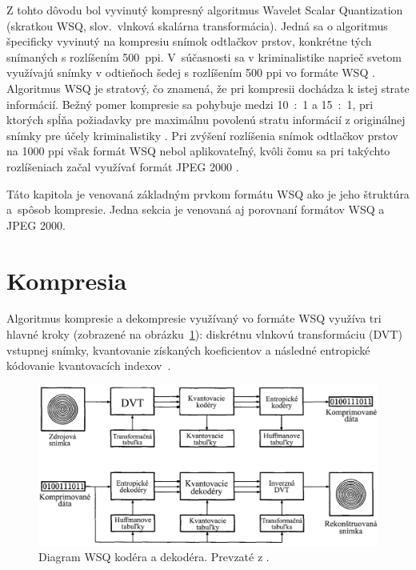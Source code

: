   Z tohto dôvodu bol vyvinutý kompresný algoritmus Wavelet Scalar Quantization (skratkou WSQ, slov.~vlnková skalárna transformácia).
  Jedná sa o algoritmus špecificky vyvinutý na kompresiu snímok odtlačkov prstov, konkrétne tých snímaných s rozlíšením 500~ppi. V~súčasnosti sa
  v kriminalistike naprieč svetom využívajú snímky v odtieňoch šedej s rozlíšením 500 ppi vo formáte WSQ \cite{Libert}.
  Algoritmus WSQ je stratový, čo znamená, že pri kompresii dochádza k istej strate informácií. Bežný pomer kompresie sa pohybuje medzi 10~:~1 a 15~:~1,
  pri ktorých spĺňa požiadavky pre maximálnu povolenú stratu informácií z originálnej snímky pre účely kriminalistiky \cite{Handbook}.
  Pri zvýšení rozlíšenia snímok odtlačkov prstov na 1000 ppi však formát WSQ nebol aplikovateľný, kvôli čomu sa pri takýchto rozlíšeniach
  začal využívať formát JPEG 2000 \cite{Libert}.

  Táto kapitola je venovaná základným prvkom formátu WSQ ako je jeho štruktúra a~spôsob kompresie. Jedna sekcia je venovaná aj porovnaní formátov
  WSQ a JPEG 2000.

  \section{Kompresia}
  Algoritmus kompresie a dekompresie využívaný vo formáte WSQ využíva tri hlavné kroky (zobrazené na obrázku~{\ref{obr:WSQ_diagram}}):
  diskrétnu vlnkovú transformáciu (DVT) vstupnej snímky, kvantovanie získaných koeficientov a následné entropické kódovanie kvantovacích indexov~{\cite{Bradley}}.

  \begin{figure}[h]
    \centering
    \includegraphics[width=0.8\linewidth]{obrazky-figures/WSQ_encoder_decoder.png}
    \caption{Diagram WSQ kodéra a dekodéra. Prevzaté z \cite{Bradley}.}
    \label{obr:WSQ_diagram}
  \end{figure}
  
